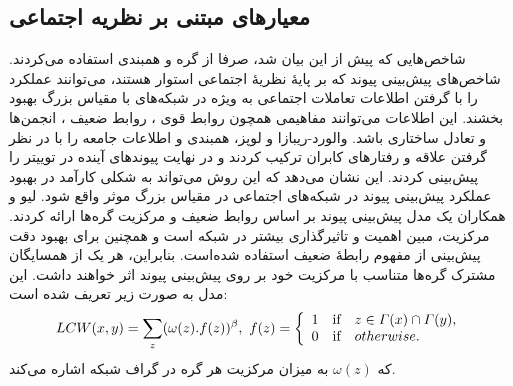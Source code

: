 \subsection{معیارهای مبتنی بر نظریه اجتماعی}
شاخص‌هایی که پیش از این بیان شد، صرفا از گره و همبندی استفاده می‌کردند. شاخص‌های پیش‌بینی پیوند که بر پایهٔ نظریهٔ اجتماعی استوار هستند، می‌توانند عملکرد را با گرفتن اطلاعات تعاملات اجتماعی به ویژه در شبکه‌های با مقیاس بزرگ بهبود بخشند\cite{song2009scalable}. این اطلاعات می‌توانند مفاهیمی همچون روابط قوی ، روابط ضعیف ، انجمن‌ها و تعادل ساختاری باشد.
والورد-ریبازا و لوپز، همبندی و اطلاعات جامعه را با در نظر گرفتن علاقه و رفتارهای کابران ترکیب کردند و در نهایت پیوندهای آینده در توییتر را پیش‌بینی کردند\cite{valverde2013exploiting}. این نشان می‌دهد که این روش می‌تواند به شکلی کارآمد در بهبود عملکرد پیش‌بینی پیوند در شبکه‌های اجتماعی در مقیاس بزرگ موثر واقع شود. 
لیو و همکاران یک مدل پیش‌بینی پیوند بر اساس روابط ضعیف و مرکزیت گره‌ها ارائه کردند. مرکزیت، مبین اهمیت و تاثیرگذاری بیشتر در شبکه است و همچنین برای بهبود دقت پیش‌بینی از مفهوم رابطهٔ ضعیف استفاده شده‌است. بنابراین، هر یک از همسایگان مشترک گره‌ها متناسب با مرکزیت خود بر روی پیش‌بینی پیوند اثر خواهند داشت. این مدل به صورت زیر تعریف شده است:
\begin{equation}
LCW(x,y) = \sum _{z} (\omega (z).f(z))^{\beta}, \\\ f(z)=  \left\{
              \begin{array}{lcl}
                1 & \text{if} &  z \in \varGamma (x) \cap \varGamma (y)  ,\\
                0 & \text{if} & otherwise.
              \end{array} \right.
\end{equation}
که $\omega (z)$ به میزان مرکزیت هر گره در گراف شبکه اشاره می‌کند.

